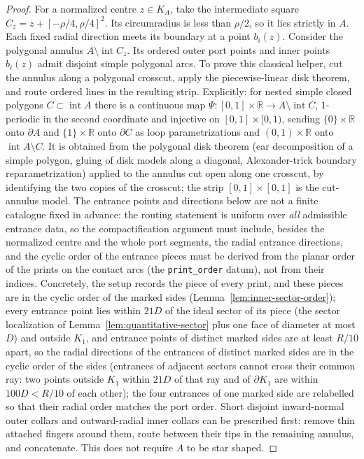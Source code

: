 \documentclass[11pt,a4paper]{article}
\theoremstyle{remark}
\begin{document}
\begin{proof}
For a normalized centre $z\in K_A$, take the intermediate square
$C_z=z+[-\rho/4,\rho/4]^2$.  Its circumradius is less than $\rho/2$,
so it lies strictly in $A$.  Each fixed radial direction meets its
boundary at a point $b_i(z)$.  Consider the polygonal annulus
$A\setminus\operatorname{int}C_z$.  Its ordered outer port points and
inner points $b_i(z)$ admit disjoint simple polygonal arcs.  To prove this
classical helper, cut the annulus along a polygonal crosscut, apply the
piecewise-linear disk theorem, and route ordered lines in the resulting
strip.  Explicitly: for nested simple closed polygons $C\subset\operatorname{int}A$
there is a continuous map $\Psi\colon[0,1]\times\mathbb R\to A\setminus\operatorname{int}C$,
$1$-periodic in the second coordinate and injective on $[0,1]\times[0,1)$,
sending $\{0\}\times\mathbb R$ onto $\partial A$ and $\{1\}\times\mathbb R$ onto
$\partial C$ as loop parametrizations and $(0,1)\times\mathbb R$ onto
$\operatorname{int}A\setminus C$.  It is obtained from the polygonal disk
theorem (ear decomposition of a simple polygon, gluing of disk models along
a diagonal, Alexander-trick boundary reparametrization) applied to the
annulus cut open along one crosscut, by identifying the two copies of the
crosscut; the strip $[0,1]\times[0,1]$ is the cut-annulus model.  The
entrance points and directions below are not a finite catalogue fixed in
advance: the routing statement is uniform over \emph{all} admissible
entrance data, so the compactification argument must include, besides the
normalized centre and the whole port segments, the radial entrance
directions, and the cyclic order of the entrance pieces must be derived
from the planar order of the prints on the contact arcs (the
\texttt{print\_order} datum), not from their indices.  Concretely, the
setup records the piece of every print, and these pieces are in the cyclic
order of the marked sides (Lemma~\ref{lem:inner-sector-order}); every
entrance point lies within $21D$ of the ideal sector of its piece (the
sector localization of Lemma~\ref{lem:quantitative-sector} plus one face of
diameter at most $D$) and outside $K_1$, and entrance points of distinct
marked sides are at least $R/10$ apart, so the radial directions of the
entrances of distinct marked sides are in the cyclic order of the sides
(entrances of adjacent sectors cannot cross their common ray: two points
outside $K_1$ within $21D$ of that ray and of $\partial K_1$ are within
$100D<R/10$ of each other); the four entrances of one marked side are
relabelled so that their radial order matches the port order.  Short disjoint inward-normal outer collars and outward-radial
inner collars can be prescribed first: remove thin attached fingers
around them, route between their tips in the remaining annulus, and
concatenate.  This does not require $A$ to be star shaped.


\end{proof}
\end{document}
